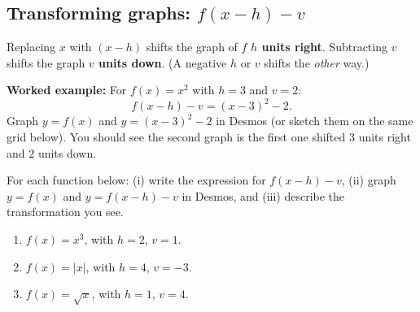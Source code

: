 \documentclass[11pt]{article}
\newcommand{\ans}{\hrulefill}
\newcommand{\anshere}{\par\vspace{0.3em}\noindent\ans\par\vspace{0.3em}}
\newcommand{\gridaxis}[5]{%
  \begin{axis}[
    width=4.6cm, height=4.3cm,
    xmin=#1, xmax=#2, ymin=#3, ymax=#4,
    grid=both, grid style={line width=.1pt, draw=gray!35},
    axis lines=middle,
    xlabel={$x$}, ylabel={$y$},
    xtick distance=#5, ytick distance=#5,
    tick label style={font=\tiny},
    label style={font=\small},
    xlabel style={at={(axis description cs:1,0)}, anchor=north west},
    ylabel style={at={(axis description cs:0,1)}, anchor=south east},
    axis line style={-{Latex[length=1.8mm]}},
  ]
}
\begin{document}
\vspace{0.4em}
\subsection*{Transforming graphs: $f(x-h)-v$}
\noindent Replacing $x$ with $(x-h)$ shifts the graph of $f$ \textbf{$h$ units right}.
Subtracting $v$ shifts the graph \textbf{$v$ units down}. (A negative $h$ or $v$ shifts the
\emph{other} way.)

\vspace{0.3em}
\noindent\textbf{Worked example:} For $f(x)=x^2$ with $h=3$ and $v=2$:
\[
  f(x-h)-v = (x-3)^2-2.
\]
Graph $y=f(x)$ and $y=(x-3)^2-2$ in Desmos (or sketch them on the same grid below). You should
see the second graph is the first one shifted $3$ units right and $2$ units down.

\begin{center}
\end{center}

\vspace{0.4em}
\noindent For each function below: (i) write the expression for $f(x-h)-v$, (ii) graph $y=f(x)$
and $y=f(x-h)-v$ in Desmos, and (iii) describe the transformation you see.

\begin{enumerate}[label=(\alph*)]
  \item $f(x) = x^3$, with $h=2$, $v=1$.
  \anshere
  \item $f(x) = |x|$, with $h=4$, $v=-3$.
  \anshere
  \item $f(x) = \sqrt{x}$, with $h=1$, $v=4$.
  \anshere
\end{enumerate}
\endgroup
\end{document}
